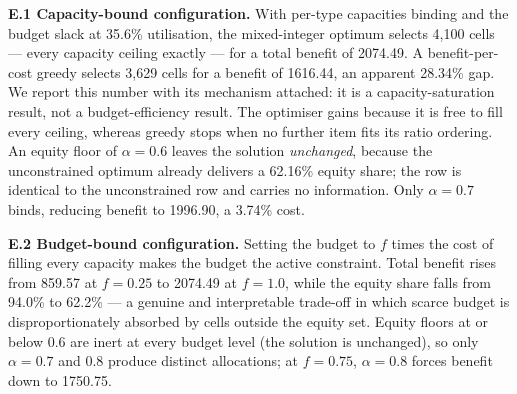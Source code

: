 \documentclass[conference]{IEEEtran}
\begin{document}
\textbf{E.1 Capacity-bound configuration.} With per-type capacities binding and the budget slack at 35.6\%
utilisation, the mixed-integer optimum selects 4,100 cells --- every capacity ceiling exactly --- for a
total benefit of 2074.49. A benefit-per-cost greedy selects 3,629 cells for a benefit of 1616.44, an
apparent 28.34\% gap. We report this number with its mechanism attached: it is a capacity-saturation
result, not a budget-efficiency result. The optimiser gains because it is free to fill every ceiling,
whereas greedy stops when no further item fits its ratio ordering. An equity floor of
\(\alpha = 0.6\) leaves the solution \emph{unchanged}, because the unconstrained optimum already delivers a
62.16\% equity share; the row is identical to the unconstrained row and carries no information. Only
\(\alpha = 0.7\) binds, reducing benefit to 1996.90, a 3.74\% cost.

\textbf{E.2 Budget-bound configuration.} Setting the budget to \(f\) times the cost of filling every capacity
makes the budget the active constraint. Total benefit rises from 859.57 at \(f = 0.25\) to 2074.49 at
\(f = 1.0\), while the equity share falls from 94.0\% to 62.2\% --- a genuine and interpretable trade-off in
which scarce budget is disproportionately absorbed by cells outside the equity set. Equity floors at or
below 0.6 are inert at every budget level (the solution is unchanged), so only \(\alpha = 0.7\) and 0.8
produce distinct allocations; at \(f = 0.75\), \(\alpha = 0.8\) forces benefit down to 1750.75.
\end{document}
